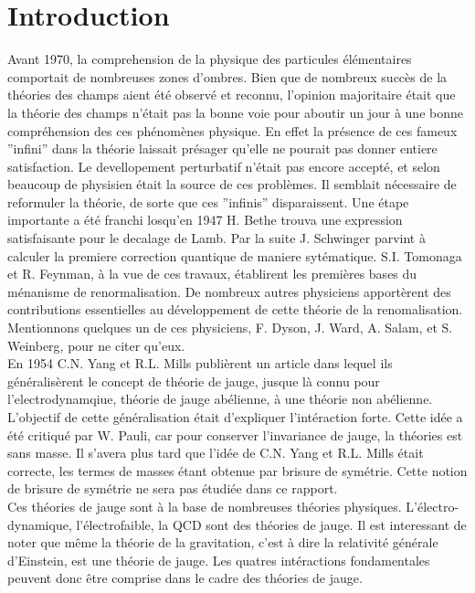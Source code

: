 \documentclass[a4paper,11pt]{article} %
\theoremstyle{plain}
\theoremstyle{definition}
\theoremstyle{remark}
\numberwithin{equation}{section}
\numberwithin{equation}{subsection}
\numberwithin{figure}{section}
\begin{document}
\newpage

\tableofcontents 

\newpage

\section{Introduction}

Avant 1970, la comprehension de la physique des particules élémentaires comportait de nombreuses zones d'ombres. Bien que de nombreux succès de la théories des champs aient été observé et reconnu, l'opinion majoritaire était que la théorie des champs n'était pas la bonne voie pour aboutir un jour à une bonne compréhension des ces phénomènes physique. En effet la présence de ces fameux ''infini'' dans la théorie laissait présager qu'elle ne pourait pas donner entiere satisfaction. Le devellopement perturbatif n'était pas encore accepté, et selon beaucoup de physisien était la source de ces problèmes. Il semblait nécessaire de reformuler la théorie, de sorte que ces ''infinis'' disparaissent. Une étape importante a été franchi losqu'en 1947 H. Bethe trouva une expression satisfaisante pour le decalage de Lamb. Par la suite J. Schwinger parvint à calculer la premiere correction quantique de maniere sytématique. S.I. Tomonaga et R. Feynman, à la vue de ces travaux, établirent les premières bases du ménanisme de 
renormalisation. De nombreux autres physiciens apportèrent des contributions essentielles au développement de cette théorie de la renomalisation. Mentionnons quelques un de ces physiciens, F. Dyson, J. Ward, A. Salam, et S. Weinberg, pour ne citer qu'eux. \\

En 1954 C.N. Yang et R.L. Mills publièrent un article dans lequel ils généralisèrent le concept de théorie de jauge, jusque là connu pour l'electrodynamqiue, théorie de jauge abélienne, à une théorie non abélienne. L'objectif de cette généralisation était d'expliquer l'intéraction forte. Cette idée a été critiqué par W. Pauli, car pour conserver l'invariance de jauge, la théories est sans masse. Il s'avera plus tard que l'idée de C.N. Yang et R.L. Mills était correcte, les termes de masses étant obtenue par brisure de symétrie. Cette notion de brisure de symétrie ne sera pas étudiée dans ce rapport.\\

Ces théories de jauge sont à la base de nombreuses théories physiques. L'électro-dynamique, l'électrofaible, la QCD sont des théories de jauge. Il est interessant de noter que même la théorie de la gravitation, c'est à dire la relativité générale d'Einstein, est une théorie de jauge. Les quatres intéractions fondamentales peuvent donc être comprise dans le cadre des théories de jauge. \\
\end{document}

